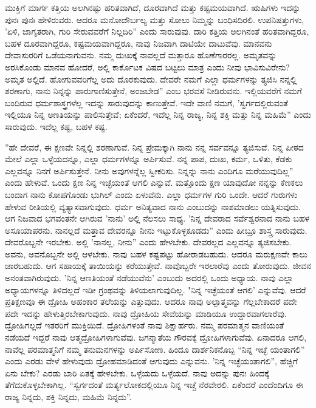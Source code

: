 ಮುಕ್ತಿಗೆ ಮಾರ್ಗ ಕತ್ತಿಯ ಅಲಗಿನಷ್ಟು ಹರಿತವಾಗಿದೆ, ದೂರವಾಗಿದೆ ಮತ್ತು ಕಷ್ಟಮಯವಾಗಿದೆ. ಋಷಿಗಳು ಇದನ್ನು ಪುನಃ ಪುನಃ ಹೇಳಿರುವರು. ಆದರೂ ಮನೋದೌರ್ಬಲ್ಯ ಮತ್ತು ಸೋಲು ನಿಮ್ಮನ್ನು ಬಂಧಿಸದಿರಲಿ. ಉಪನಿಷತ್ತುಗಳು, 'ಏಳಿ, ಜಾಗೃತರಾಗಿ, ಗುರಿ ಸೇರುವವರೆಗೆ ನಿಲ್ಲದಿರಿ'' ಎಂದು ಸಾರುವುವು. ದಾರಿ ಕತ್ತಿಯ ಅಲಗಿನಂತೆ ಹರಿತವಾಗಿದ್ದರೂ, ಬಹಳ ದೂರವಾಗಿದ್ದರೂ, ಕಷ್ಟಮಯವಾಗಿದ್ದರೂ, ನಾವು ನಿಜವಾಗಿ ದಾಟಿಯೇ ದಾಟುವೆವು. ಮಾನವನು ದೇವಾಸುರರಿಗೆ ಒಡೆಯನಾಗುವನು. ನಮ್ಮ ದುಃಖಕ್ಕೆ ನಾವಲ್ಲದೆ ಮತ್ತಾರೂ ಹೊಣೆಗಾರರಲ್ಲ. ಅಮೃತವನ್ನು ಅರಸಿಕೊಂಡು ಮಾನವ ಹೋದರೆ, ಅಲ್ಲಿ ಕಾರ್ಕೊಟಕ ವಿಷದ ಬಟ್ಟಲು ಮಾತ್ರ ಎಂದು ನೀವು ಭಾವಿಸುವಿರೇನು? ಅಮೃತ ಅಲ್ಲಿದೆ. ಹೋಗುವವರಿಗೆಲ್ಲ ಅದು ದೊರಕುವುದು. ದೇವರೇ ನಮಗೆ ಎಲ್ಲಾ ಧರ್ಮಗಳನ್ನು ತ್ಯಜಿಸಿ ನನ್ನಲ್ಲಿ ಶರಣಾಗು, ನಾನು ನಿನ್ನನ್ನು ಪಾರುಗಾಣಿಸುತ್ತೇನೆ, ಅಂಜಬೇಡ'' ಎಂಬ ಭರವಸೆ ನೀಡಿರುವನು. ಇಲ್ಲಿಯವರೆಗೆ ನಮಗೆ ಬಂದಿರುವ ಧರ್ಮಶಾಸ್ತ್ರಗಳೆಲ್ಲ ಇದನ್ನು ಸಾರುವುದನ್ನು ಕಾಣುತ್ತೇವೆ. ಇದೇ ವಾಣಿ ನಮಗೆ, 'ಸ್ವರ್ಗದಲ್ಲಿರುವಂತೆ ಇಲ್ಲಿಯೂ ನಿನ್ನ ಅಣತಿಯನ್ನು ಪಾಲಿಸುತ್ತೇವೆ; ಏಕೆಂದರೆ, ಇದೆಲ್ಲ ನಿನ್ನ ರಾಜ್ಯ, ನಿನ್ನ ಶಕ್ತಿ ಮತ್ತು ನಿನ್ನ ಮಹಿಮೆ'' ಎಂದು ಸಾರುವುದು. ಇದೆಲ್ಲ ಕಷ್ಟ, ಬಹಳ ಕಷ್ಟ.

''ಹೇ ದೇವರೆ, ಈ ಕ್ಷಣವೇ ನಿನ್ನಲ್ಲಿ ಶರಣಾಗುವೆ. ನಿನ್ನ ಪ್ರೇಮಕ್ಕಾಗಿ ನಾನು ನನ್ನ ಸರ್ವವನ್ನೂ ತ್ಯಜಿಸುವೆ. ನಿನ್ನ ಪೀಠದ ಮೇಲೆ ಎಲ್ಲಾ ಒಳ್ಳೆಯದನ್ನೂ, ಎಲ್ಲಾ ಧರ್ಮಗಳನ್ನೂ ಅರ್ಪಿಸುವೆ. ನನ್ನ ಪಾಪ, ದುಃಖ, ಕರ್ಮ, ಒಳಿತು, ಕೆಡಕು ಎಲ್ಲವನ್ನೂ ನಿನಗೆ ಅರ್ಪಿಸುತ್ತೇನೆ. ನೀನು ಅವುಗಳನ್ನೆಲ್ಲ ಸ್ವೀಕರಿಸು. ನಿನ್ನನ್ನು ನಾನು ಎಂದಿಗೂ ಮರೆಯುವುದಿಲ್ಲ” ಎಂದು ಹೇಳುವೆ. ಒಂದು ಕ್ಷಣ ನಿನ್ನ ಇಚ್ಛೆಯಂತೆ ಆಗಲಿ ಎನ್ನುವೆ. ಮತ್ತೊಂದು ಕ್ಷಣ ಯಾವುದೋ ನನ್ನನ್ನು ಕೆಣಕಲು ಬಂದಾಗ ನಾನು ಕೋಪಗೊಂಡು ಭುಗಿಲ್ ಎಂದು ಏಳುವೆನು. ಎಲ್ಲಾ ಧರ್ಮಗಳ ಗುರಿ ಒಂದೇ. ಆದರೆ ಗುರುಗಳು ಹೇಳುವ ರೀತಿಯಲ್ಲಿ ವ್ಯತ್ಯಾಸವಾಗುವುದು. ಧರ್ಮ ಅನಿತ್ಯವಾದ ನಾನು ಎಂಬುದನ್ನು ನಾಶಮಾಡಲು ಯತ್ನಿಸುವುದು. ಆಗ ನಿಜವಾದ ಭಗವಂತನೇ ಆಗಿರುವ 'ನಾನು' ಅಲ್ಲಿ ನೆಲಸಲು ಸಾಧ್ಯ. 'ನಿನ್ನ ದೇವರಾದ ಸರ್ವೆಶ್ವರನಾದ ನಾನು ಬಹಳ ಅಸೂಯಾಪರನು. ನಾನಲ್ಲದೆ ಮತ್ತಾವ ದೇವರನ್ನೂ ನೀನು ಇಟ್ಟುಕೊಳ್ಳಕೂಡದು'' ಎಂದು ಹೀಬ್ರೂ ಶಾಸ್ತ್ರ ಸಾರುವುದು. ದೇವರೊಬ್ಬನೇ ಇರಬೇಕು. ಅಲ್ಲಿ 'ನಾನಲ್ಲ, ನೀನು'' ಎಂದು ಹೇಳಬೇಕು. ದೇವರಲ್ಲದ ಎಲ್ಲವನ್ನೂ ತ್ಯಜಿಸಬೇಕು. ಅವನು, ಅವನೊಬ್ಬನೇ ಅಲ್ಲಿ ಆಳಬೇಕು. ನಾವು ಬಹಳ ಕಷ್ಟಪಟ್ಟು ಹೋರಾಡಬಹುದು. ಆದರೂ ಮರುಕ್ಷಣವೇ ಕಾಲು ಜಾರಬಹುದು. ಆಗ ಸಹಾಯಕ್ಕೆ ತಾಯಿಯನ್ನು ಕರೆಯುತ್ತೇವೆ. ನಾವೊಬ್ಬರೇ ಇರಲಾರೆವು ಎಂದು ತೋರುವುದು. ಜೀವನ ಅನಂತವಾಗಿರುವುದು. 'ನಿನ್ನ ಆಣತಿಯಂತೆ ನಡೆಯುವೆನು' ಎಂಬುದು ಅದರಲ್ಲಿ ಒಂದು ಅಧ್ಯಾಯ. ನಾವು ಎಲ್ಲಾ ಅಧ್ಯಾಯಗಳನ್ನೂ ತಿಳಿದಲ್ಲದೆ ಇಡೀ ಗ್ರಂಥವನ್ನು ತಿಳಿಯಲಾಗುವುದಿಲ್ಲ. "ನಿನ್ನ ಇಚ್ಛೆಯಂತೆ ಆಗಲಿ' ಎನ್ನುವೆವು. ಆದರೆ ಪ್ರತಿಕ್ಷಣವೂ ಈ ದ್ರೋಹಿ ಅಹಂಕಾರ ತಲೆಯನ್ನು ಎತ್ತುವುದು. ಆದರೂ ನಾವು ಅಲ್ಪಾತ್ಮವನ್ನು ಗೆಲ್ಲಬೇಕಾದರೆ ಪದೇ ಪದೇ ಇದನ್ನು ಹೇಳುತ್ತಿರಬೇಕಾಗುವುದು. ನಾವು ದ್ರೋಹಿಯ ಸೇವೆಯನ್ನು ಮಾಡಿಯೂ ಉದ್ದಾರವಾಗಲಾರೆವು. ದ್ರೋಹಿಗಲ್ಲದೆ ಇತರರಿಗೆ ಮುಕ್ತಿಯಿದೆ. ದ್ರೋಹಿಗಳಂತೆ ನಾವು ಶಿಕ್ಷಾರ್ಹರು. ನಮ್ಮ ಪರಮಾತ್ಮನ ವಾಣಿಯಂತೆ ನಡೆಯದೆ ಇದ್ದರೆ ನಾವು ಆತ್ಮದ್ರೋಹಿಗಳಾಗುವೆವು. ಜಗನ್ಮಾತೆಯ ಗೌರವಕ್ಕೆ ದ್ರೋಹಿಗಳಾಗುವೆವು. ಏನಾದರೂ ಆಗಲಿ, ನಾವೆಲ್ಲ ಪರಮಾತ್ಮನಿಗೆ ನಮ್ಮ ತನುಮನಗಳನ್ನು ಅರ್ಪಿಸೋಣ. ಹಿಂದೂ ದಾರ್ಶನಿಕನೊಬ್ಬ “ನಿನ್ನ ಇಚ್ಛೆ ಯಂತಾಗಲಿ'' ಎಂದು ಎರಡು ವೇಳೆ ಹೇಳುವುದು ದ್ರೋಹಮಾಡಿದಂತೆ ಆಗುವುದು ಎನ್ನುವನು. 'ನಿನ್ನ ಇಚ್ಛೆಯಂತಾಗಲಿ”, ಹೆಚ್ಚಿಗೆ ಏನು ಬೇಕು? ಎರಡು ಬಾರಿ ಏತಕ್ಕೆ ಹೇಳಬೇಕು. ಒಳ್ಳೆಯದು ಒಳ್ಳೆಯದೆ. ನಾವು ಅದನ್ನು ಪುನಃ ಹಿಂದಕ್ಕೆ ತೆಗೆದುಕೊಳ್ಳಬೇಕಾಗಿಲ್ಲ. “ಸ್ವರ್ಗದಂತೆ ಮರ್ತ್ಯಲೋಕದಲ್ಲಿಯೂ ನಿನ್ನ ಇಚ್ಚೆ ನೆರವೇರಲಿ. ಏಕೆಂದರೆ ಎಂದೆಂದಿಗೂ ಈ ರಾಜ್ಯ ನಿನ್ನದು, ಶಕ್ತಿ ನಿನ್ನದು, ಮಹಿಮೆ ನಿನ್ನದು”.

